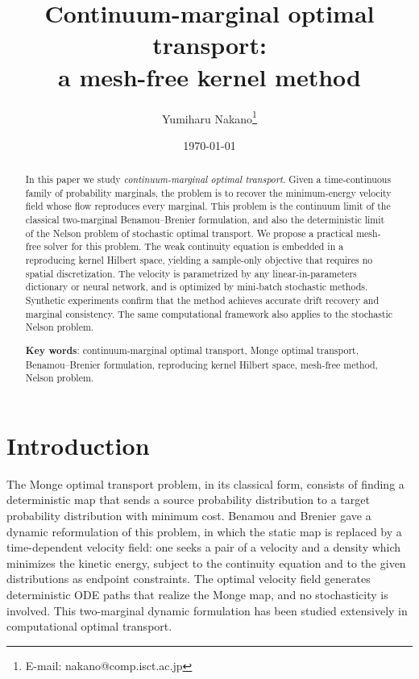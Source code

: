\documentclass[11pt,leqno]{article}
\title{Continuum-marginal optimal transport:\\
  a mesh-free kernel method}
\author[1]{Yumiharu Nakano\thanks{E-mail: nakano@comp.isct.ac.jp}}
\affil[1]{Department of Mathematical and Computing Science \protect \\
  Institute of Science Tokyo}
\date{\today}
\theoremstyle{plain}
\theoremstyle{remark}
\theoremstyle{definition}
\numberwithin{equation}{section}
\numberwithin{figure}{section}
\numberwithin{table}{section}
\begin{document}
\maketitle

\begin{abstract}
In this paper we study \emph{continuum-marginal optimal transport}.
Given a time-continuous family of probability marginals, the problem
is to recover the minimum-energy velocity field whose flow reproduces
every marginal.
This problem is the continuum limit of the classical two-marginal
Benamou--Brenier formulation, and also the deterministic limit of the
Nelson problem of stochastic optimal transport.
We propose a practical mesh-free solver for this problem.
The weak continuity equation is embedded in a reproducing kernel
Hilbert space, yielding a sample-only objective that requires no spatial discretization.
The velocity is parametrized by any linear-in-parameters dictionary or
neural network, and is optimized by mini-batch stochastic methods.
Synthetic experiments confirm that the method achieves accurate drift
recovery and marginal consistency.
The same computational framework also applies to the stochastic
Nelson problem. 

\begin{flushleft}
{\bf Key words}:
continuum-marginal optimal transport,
Monge optimal transport, Benamou--Brenier formulation, 
reproducing kernel Hilbert space, mesh-free method,
Nelson problem. 
\end{flushleft}
\end{abstract}

\section{Introduction}
\label{sec:intro}

The Monge optimal transport problem, in its classical form, consists of
finding a deterministic map that sends a source probability distribution
to a target probability distribution with minimum cost.
Benamou and Brenier \cite{ben-bre:2000} gave a dynamic reformulation of
this problem, in which the static map is replaced by a time-dependent
velocity field: one seeks a pair of a velocity and a density which
minimizes the kinetic energy, subject to the continuity equation and
to the given distributions as endpoint constraints.
The optimal velocity field generates deterministic ODE paths that
realize the Monge map, and no stochasticity is involved.
This two-marginal dynamic formulation has been studied extensively in
computational optimal transport.
\end{document}
